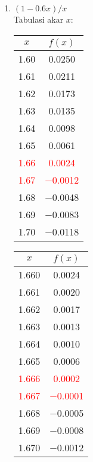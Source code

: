 \documentclass{article}
\begin{document}
\begin{enumerate}
\begin{enumerate}
        \item $(1 - \num{0,6}x)/x$ \\
        Tabulasi akar $x$: \\
        \begin{tabular}{|c|c|}
            \hline
            $x$   & $f(x)$ \\
            \hline
            \num{1,60} & \num{0,0250} \\
            \num{1,61} & \num{0,0211} \\
            \num{1,62} & \num{0,0173} \\
            \num{1,63} & \num{0,0135} \\
            \num{1,64} & \num{0,0098} \\
            \num{1,65} & \num{0,0061} \\
            \textcolor{red}{\num{1,66}} & \textcolor{red}{\num{0,0024}} \\
            \textcolor{red}{\num{1,67}} & \textcolor{red}{\num{-0,0012}} \\
            \num{1,68} & \num{-0,0048} \\
            \num{1,69} & \num{-0,0083} \\
            \num{1,70} & \num{-0,0118} \\
            \hline
            \end{tabular}\quad
            \begin{tabular}{|c|c|}
            \hline
            $x$   & $f(x)$ \\
            \hline
            \num{1,660} & \num{0,0024} \\
            \num{1,661} & \num{0,0020} \\
            \num{1,662} & \num{0,0017} \\
            \num{1,663} & \num{0,0013} \\
            \num{1,664} & \num{0,0010} \\
            \num{1,665} & \num{0,0006} \\
            \textcolor{red}{\num{1,666}} & \textcolor{red}{\num{0,0002}} \\
            \textcolor{red}{\num{1,667}} & \textcolor{red}{\num{-0,0001}} \\
            \num{1,668} & \num{-0,0005} \\
            \num{1,669} & \num{-0,0008} \\
            \num{1,670} & \num{-0,0012} \\
            \hline
            \end{tabular}\quad

\end{enumerate}
\end{enumerate}
\end{document}
